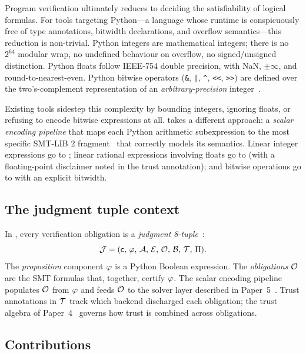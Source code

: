 \documentclass[11pt]{article}
\begin{document}
Program verification ultimately reduces to deciding the satisfiability
of logical formulas.
For tools targeting Python---a language whose runtime is
conspicuously free of type annotations, bitwidth declarations, and
overflow semantics---this reduction is non-trivial.
Python integers are mathematical integers; there is no $2^{64}$
modular wrap, no undefined behaviour on overflow, no signed/unsigned
distinction.
Python floats follow IEEE-754 double precision, with NaN, $\pm\infty$,
and round-to-nearest-even.
Python bitwise operators (\lstinline{&}, \lstinline{|}, \lstinline{^},
\lstinline{<<}, \lstinline{>>}) are defined over the two's-complement
representation of an \emph{arbitrary-precision} integer~\cite{python3}.

Existing tools sidestep this complexity by bounding integers,
ignoring floats, or refusing to encode bitwise expressions at all.
\JuGeo{} takes a different approach: a \emph{scalar encoding
pipeline} that maps each Python arithmetic subexpression to the
most specific SMT-LIB 2 fragment~\cite{smtlib} that correctly
models its semantics.
Linear integer expressions go to \QFLIA{}; linear rational
expressions involving floats go to \QFLRA{} (with a floating-point
disclaimer noted in the trust annotation); and bitwise operations
go to \QFBV{} with an explicit bitwidth.

\subsection{The judgment tuple context}

In \JuGeo{}, every verification obligation is a \emph{judgment
8-tuple}~\cite{paper02}:
\[
  \mathcal{J} = (\mathsf{c},\,\varphi,\,\mathcal{A},\,\mathcal{E},\,\mathcal{O},\,\mathcal{B},\,\mathcal{T},\,\Pi).
\]
The \emph{proposition} component $\varphi$ is a Python Boolean
expression.
The \emph{obligations} $\mathcal{O}$ are the SMT formulas that, together,
certify $\varphi$.
The scalar encoding pipeline populates $\mathcal{O}$ from $\varphi$ and
feeds $\mathcal{O}$ to the solver layer described in Paper~5~\cite{paper05}.
Trust annotations in $\mathcal{T}$ track which backend discharged each
obligation; the trust algebra of Paper~4~\cite{paper04} governs
how trust is combined across obligations.

\subsection{Contributions}
\end{document}
